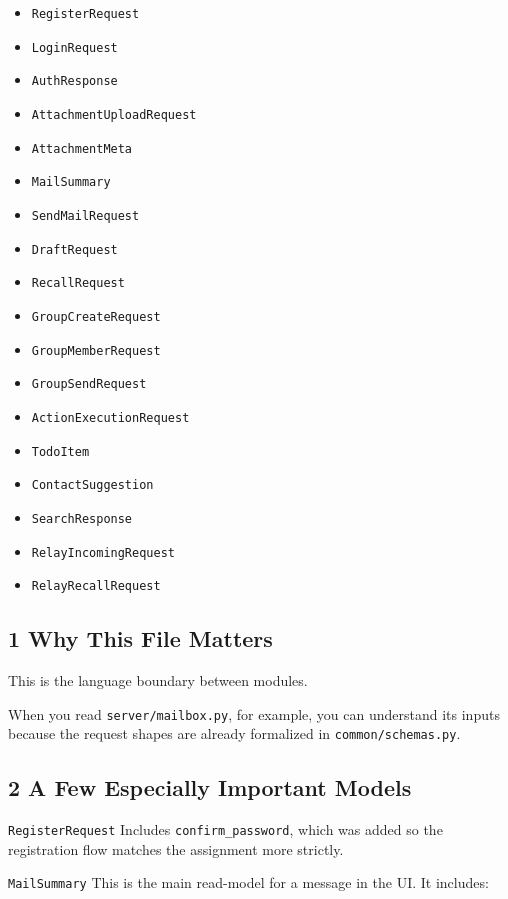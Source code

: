 \documentclass[11pt,a4paper]{article}
\begin{document}
\begin{itemize}
\item \nolinkurl{RegisterRequest}
\item \nolinkurl{LoginRequest}
\item \nolinkurl{AuthResponse}
\item \nolinkurl{AttachmentUploadRequest}
\item \nolinkurl{AttachmentMeta}
\item \nolinkurl{MailSummary}
\item \nolinkurl{SendMailRequest}
\item \nolinkurl{DraftRequest}
\item \nolinkurl{RecallRequest}
\item \nolinkurl{GroupCreateRequest}
\item \nolinkurl{GroupMemberRequest}
\item \nolinkurl{GroupSendRequest}
\item \nolinkurl{ActionExecutionRequest}
\item \nolinkurl{TodoItem}
\item \nolinkurl{ContactSuggestion}
\item \nolinkurl{SearchResponse}
\item \nolinkurl{RelayIncomingRequest}
\item \nolinkurl{RelayRecallRequest}
\end{itemize}

\subsection{1 Why This File Matters}

This is the language boundary between modules.

When you read \nolinkurl{server/mailbox.py}, for example, you can understand its inputs because the request shapes are already formalized in \nolinkurl{common/schemas.py}.

\subsection{2 A Few Especially Important Models}

\nolinkurl{RegisterRequest} Includes \nolinkurl{confirm_password}, which was added so the registration flow matches the assignment more strictly.

\nolinkurl{MailSummary} This is the main read-model for a message in the UI. It includes:
\end{document}
